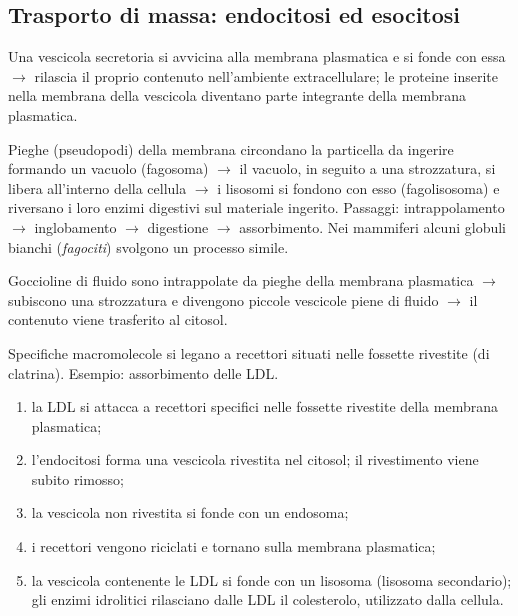 \subsection{Trasporto di massa: endocitosi ed esocitosi}

Una vescicola secretoria si avvicina alla membrana plasmatica e si fonde con essa $\rightarrow$ rilascia il proprio contenuto nell'ambiente extracellulare; le proteine inserite nella membrana della vescicola diventano parte integrante della membrana plasmatica.

Pieghe (pseudopodi) della membrana circondano la particella da ingerire formando un vacuolo (fagosoma) $\rightarrow$ il vacuolo, in seguito a una strozzatura, si libera all'interno della cellula $\rightarrow$ i lisosomi si fondono con esso (fagolisosoma) e riversano i loro enzimi digestivi sul materiale ingerito. Passaggi: intrappolamento $\rightarrow$ inglobamento $\rightarrow$ digestione $\rightarrow$ assorbimento. Nei mammiferi alcuni globuli bianchi (\textit{fagociti}) svolgono un processo simile.

Goccioline di fluido sono intrappolate da pieghe della membrana plasmatica $\rightarrow$ subiscono una strozzatura e divengono piccole vescicole piene di fluido $\rightarrow$ il contenuto viene trasferito al citosol.

Specifiche macromolecole si legano a recettori situati nelle fossette rivestite (di clatrina). Esempio: assorbimento delle LDL.
\begin{enumerate}
  \item la LDL si attacca a recettori specifici nelle fossette rivestite della membrana plasmatica;
  \item l'endocitosi forma una vescicola rivestita nel citosol; il rivestimento viene subito rimosso;
  \item la vescicola non rivestita si fonde con un endosoma;
  \item i recettori vengono riciclati e tornano sulla membrana plasmatica;
  \item la vescicola contenente le LDL si fonde con un lisosoma (lisosoma secondario); gli enzimi idrolitici rilasciano dalle LDL il colesterolo, utilizzato dalla cellula.
\end{enumerate}
